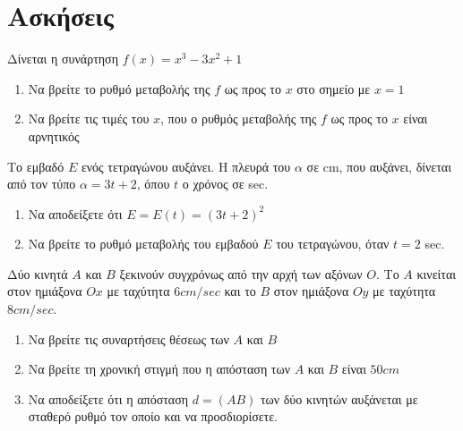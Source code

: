\documentclass{presentation}
\begin{document}
\section{Ασκήσεις}
\begin{askisi}
    Δίνεται η συνάρτηση $f(x)=x^3-3x^2+1$
    \begin{enumerate}
        \item<1-> Να βρείτε το ρυθμό μεταβολής της $f$ ως προς το $x$ στο σημείο με $x=1$
        \item<2-> Να βρείτε τις τιμές του $x$, που ο ρυθμός μεταβολής της $f$ ως προς το $x$ είναι αρνητικός
    \end{enumerate}

\end{askisi}

\begin{askisi}
    Το εμβαδό $Ε$ ενός τετραγώνου αυξάνει. Η πλευρά του $α$ σε cm, που αυξάνει, δίνεται από τον τύπο $α=3t+2$, όπου $t$ ο χρόνος σε sec.
    \begin{enumerate}
        \item<1-> Να αποδείξετε ότι $Ε=Ε(t)=(3t+2)^2$
        \item<2-> Να βρείτε το ρυθμό μεταβολής του εμβαδού $Ε$ του τετραγώνου, όταν $t=2$ sec.
    \end{enumerate}

\end{askisi}

\begin{askisi}
    Δύο κινητά $Α$ και $Β$ ξεκινούν συγχρόνως από την αρχή των αξόνων $Ο$. Το $Α$ κινείται στον ημιάξονα $Οx$ με ταχύτητα $6cm/sec$ και το $Β$ στον ημιάξονα $Οy$ με ταχύτητα $8cm/sec$.
    \begin{enumerate}
        \item<1-> Να βρείτε τις συναρτήσεις θέσεως των $Α$ και $Β$
        \item<2-> Να βρείτε τη χρονική στιγμή που η απόσταση των $Α$ και $Β$ είναι $50cm$
        \item<3-> Να αποδείξετε ότι η απόσταση $d=(ΑΒ)$ των δύο κινητών αυξάνεται με σταθερό ρυθμό τον οποίο και να προσδιορίσετε.
    \end{enumerate}

\end{askisi}
\end{document}
